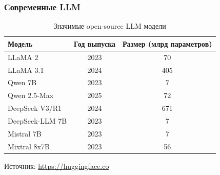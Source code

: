 \begin{frame}
  \frametitle{Современные LLM}
  \begin{table}[h]
    \centering
    \begin{tabular}{|l|c|c|}
      \hline
      \textbf{Модель} & \textbf{Год выпуска} & \textbf{Размер (млрд параметров)} \\
      \hline
      LLaMA 2         & 2023                 & 70                               \\
      LLaMA 3.1       & 2024                 & 405                              \\
      Qwen 7B         & 2023                 & 7                                \\
      Qwen 2.5-Max    & 2025                 & 72                               \\
      DeepSeek V3/R1  & 2024                 & 671                              \\
      DeepSeek-LLM 7B & 2023                 & 7                                \\
      Mistral 7B      & 2023                 & 7                                \\
      Mixtral 8x7B    & 2023                 & 56                               \\
      \hline
    \end{tabular}
    \caption{Значимые open-source LLM модели}
    \label{tab:llm_models}
  \end{table}
  \vspace{0.5cm}
  \begin{flushright}
    \tiny Источник: \url{https://huggingface.co}
  \end{flushright}
\end{frame}